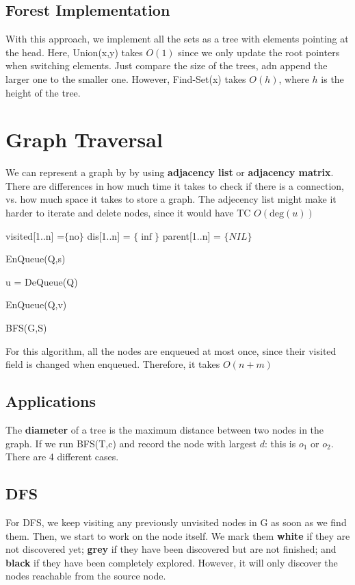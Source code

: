 \documentclass{article}
\begin{document}
\begin{multicols*}{5}
				\subsection{Forest Implementation}
					With this approach, we implement all the sets as a tree with elements pointing at the head. 
					Here, Union(x,y) takes $O(1)$ since we only update the root pointers when switching elements. 
					Just compare the size of the trees, adn append the larger one to the smaller one. However, 
					Find-Set(x) takes $O(h)$, where $h$ is the height of the tree. 
		\section{Graph Traversal}
					We can represent a graph by by using \textbf{adjacency list} or \textbf{adjacency matrix}. 
					There are differences in how much time it takes to check if there is a connection, vs. how 
					much space it takes to store a graph. The adjecency list might make it harder to iterate 
					and delete nodes, since it would have TC $O(\text{deg}(u))$

					\begin{algorithm}[H]
						\SetAlgoLined	
							visited[1..n] =$\{\text{no}\}$\;
							dis[1..n] = $\{\inf\}$\;
							parent[1..n] = $\{NIL\}$\;

							EnQueue(Q,s)\;
							{
								u = DeQueue(Q)\;			
								{
										{
											EnQueue(Q,v)\;			
										}

								}
							}
							\caption{BFS(G,S)}	
					\end{algorithm}
							For this algorithm, all the nodes are enqueued at most once, since their visited field
							is changed when enqueued. Therefore, it takes $O(n+m)$
				\subsection{Applications}
							The \textbf{diameter} of a tree is the maximum distance between two nodes in the
							graph. If we run BFS(T,c) and record the node with largest $d$: this is $o_{1}$ 
							or $o_{2}$. There are 4 different cases.
				\subsection{DFS}
							For DFS, we keep visiting any previously unvisited nodes in G as soon as we find them.
							Then, we start to work on the node itself.  We mark them \textbf{white} if they 
							are not	discovered yet; \textbf{grey} if they have been discovered but are not
							finished; and \textbf{black} if they have been completely explored. However, it 
							will only discover the nodes reachable from the source node. 


\end{multicols*}
\end{document}
